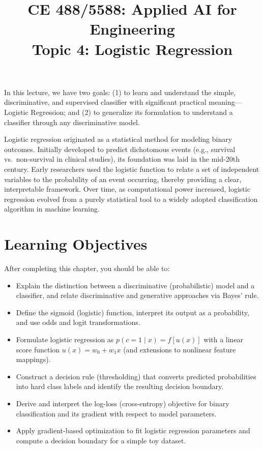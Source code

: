 \documentclass[12pt]{article}
\begin{document}
\doublespacing	

\title{CE 488/5588: Applied AI for Engineering \\ \large Topic 4: Logistic Regression}
\author{}
\date{}
\maketitle

In this lecture, we have two goals: (1) to learn and understand the simple, discriminative, and supervised classifier with significant practical meaning---Logistic Regression; and (2) to generalize its formulation to understand a classifier through any discriminative model. 

Logistic regression originated as a statistical method for modeling binary outcomes. Initially developed to predict dichotomous events (e.g., survival vs.\ non-survival in clinical studies), its foundation was laid in the mid-20th century. Early researchers used the logistic function to relate a set of independent variables to the probability of an event occurring, thereby providing a clear, interpretable framework. Over time, as computational power increased, logistic regression evolved from a purely statistical tool to a widely adopted classification algorithm in machine learning.
 
 
\section*{Learning Objectives}
After completing this chapter, you should be able to:
\begin{itemize}
    \item Explain the distinction between a discriminative (probabilistic) model and a classifier, and relate discriminative and generative approaches via Bayes' rule.
    \item Define the sigmoid (logistic) function, interpret its output as a probability, and use odds and logit transformations.
    \item Formulate logistic regression as $p(c=1\mid x)=f[u(x)]$ with a linear score function $u(x)=w_0+w_1x$ (and extensions to nonlinear feature mappings).
    \item Construct a decision rule (thresholding) that converts predicted probabilities into hard class labels and identify the resulting decision boundary.
    \item Derive and interpret the log-loss (cross-entropy) objective for binary classification and its gradient with respect to model parameters.
    \item Apply gradient-based optimization to fit logistic regression parameters and compute a decision boundary for a simple toy dataset.
\end{itemize}
\end{document}
